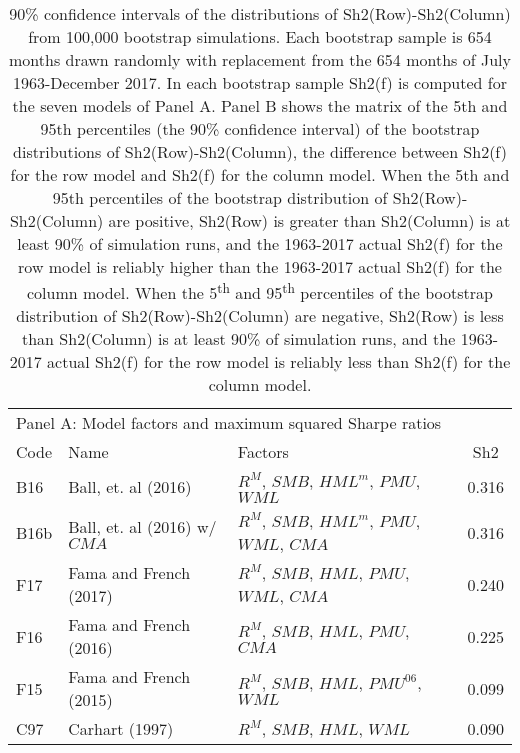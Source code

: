 
\begin{table}[!ht]
\label{tbl:bootstrap}
\centering
\caption{
\scriptsize{
90\% confidence intervals of the distributions of Sh2(Row)-Sh2(Column) from 100,000
bootstrap simulations. Each bootstrap sample is 654 months drawn randomly with replacement
from the 654 months of July 1963-December 2017. In each bootstrap sample Sh2(f) is
computed for the seven models of Panel A. Panel B shows the matrix of the 5th and 95th
percentiles (the 90\% confidence interval) of the bootstrap distributions of
Sh2(Row)-Sh2(Column), the difference between Sh2(f) for the row model and Sh2(f) for the
column model. When the 5th and 95th percentiles of the bootstrap distribution of
Sh2(Row)-Sh2(Column) are positive, Sh2(Row) is greater than Sh2(Column) is at least 90\%
of simulation runs, and the 1963-2017 actual Sh2(f) for the row model is reliably higher
than the 1963-2017 actual Sh2(f) for the column model. When the 5\textsuperscript{th} and
95\textsuperscript{th} percentiles of the bootstrap distribution of Sh2(Row)-Sh2(Column)
are negative, Sh2(Row) is less than Sh2(Column) is at least 90\% of simulation runs, and
the 1963-2017 actual Sh2(f) for the row model is reliably less than Sh2(f) for the column
model.
}
}
\begin{tabular}{lcccccc}
  \toprule
  \multicolumn{7}{l}{Panel A: Model factors and maximum squared Sharpe ratios} \\
  Code  & \multicolumn{2}{l}{Name}                         & \multicolumn{3}{l}{Factors}                                   & Sh2   \\
  B16   & \multicolumn{2}{l}{Ball, et. al (2016)}          & \multicolumn{3}{l}{$R^M$, $SMB$, $HML^m$, $PMU$, $WML$}        & 0.316 \\
  B16b  & \multicolumn{2}{l}{Ball, et. al (2016) w/ $CMA$} & \multicolumn{3}{l}{$R^M$, $SMB$, $HML^m$, $PMU$, $WML$, $CMA$} & 0.316 \\
  F17   & \multicolumn{2}{l}{Fama and French (2017)}       & \multicolumn{3}{l}{$R^M$, $SMB$, $HML$, $PMU$, $WML$, $CMA$}   & 0.240 \\
  F16   & \multicolumn{2}{l}{Fama and French (2016)}       & \multicolumn{3}{l}{$R^M$, $SMB$, $HML$, $PMU$, $CMA$}          & 0.225 \\
  F15   & \multicolumn{2}{l}{Fama and French (2015)}       & \multicolumn{3}{l}{$R^M$, $SMB$, $HML$, $PMU^{06}$, $WML$}     & 0.099 \\
  C97   & \multicolumn{2}{l}{Carhart (1997)}               & \multicolumn{3}{l}{$R^M$, $SMB$, $HML$, $WML$}                 & 0.090 \\

\end{tabular}
\end{table}
